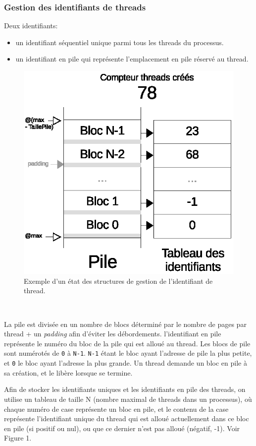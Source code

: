 \documentclass{article}
\begin{document}
		\subsubsection{Gestion des identifiants de threads}
			{Deux identifiants:}
			\begin{itemize}
				\item{un identifiant séquentiel unique parmi tous les threads du processus.}
				\item{un identifiant en pile qui représente l'emplacement en pile réservé au thread.}
			\end{itemize}
			\begin{figure}[h]
				  \centering
				  \includegraphics{schema_threads_id.eps}
				  \caption{Exemple d'un état des structures de gestion de l’identifiant de thread.}
			\end{figure}
			~\par{La pile est divisée en un nombre de blocs déterminé par le nombre de pages par thread + un \emph{padding} afin d'éviter les débordements. l'identifiant en pile représente le numéro du bloc de la pile qui est alloué au thread. Les blocs de pile sont numérotés de \texttt{0} à \texttt{N-1}. \texttt{N-1} étant le bloc ayant l'adresse de pile la plus petite, et \texttt{0} le bloc ayant l'adresse la plus grande. Un thread demande un bloc en pile à sa création, et le libère lorsque se termine.}
			~\par{Afin de stocker les identifiants uniques et les identifiants en pile des threads, on utilise un tableau de taille N (nombre maximal de threads dans un processus), où chaque numéro de case représente un bloc en pile, et le contenu de la case représente l'identifiant unique du thread qui est alloué actuellement dans ce bloc en pile (si positif ou nul), ou que ce dernier n'est pas alloué (négatif, -1). Voir Figure 1.}
\end{document}
